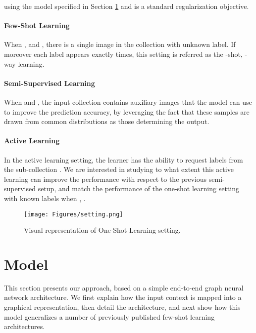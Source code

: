 \documentclass{article} \usepackage{iclr2018_conference,times}
\begin{document}
using the model  specified in Section \ref{modelsec} and
 is a standard regularization objective. 

 
\paragraph{Few-Shot Learning}
When ,  and , there is a single image in the collection with unknown label. 
If moreover each label appears exactly  times, this setting is referred as 
the -shot, -way learning. 

\paragraph{Semi-Supervised Learning}
When  and , the input collection contains auxiliary images  that the model can use to improve the 
prediction accuracy, by leveraging the fact that these samples are drawn from common distributions 
as those determining the output. 

\paragraph{Active Learning}
In the active learning setting, the learner has the ability to request labels from the 
sub-collection . 
We are interested in studying to what extent this active learning can 
improve the performance with respect to the previous semi-supervised setup, 
and match the performance of 
the one-shot learning setting with  known labels when , . 

\begin{figure}
    
    \centering
    \texttt{[image: Figures/setting.png]}

    \caption{Visual representation of One-Shot Learning setting.}
    \label{fig:setup}
\end{figure} 



\section{Model}
\label{modelsec}



This section presents our approach, based 
on a simple end-to-end graph neural network architecture. 
We first explain how the input context is mapped into a 
graphical representation, then detail the architecture, 
and next show how this model generalizes a number of previously 
published few-shot learning architectures. 
\end{document}
